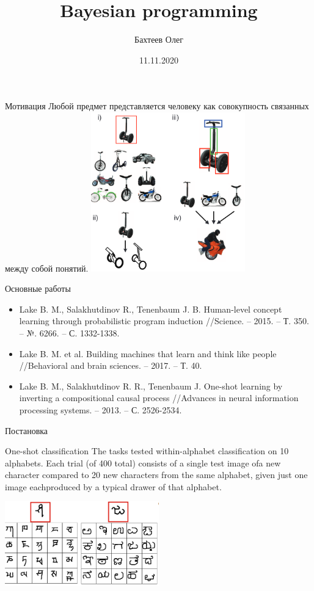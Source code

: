 \documentclass[usenames,dvipsnames,10pt,pdf,utf8,russian,aspectratio=43]{beamer}
\title[BP]{Bayesian programming}
\author{Бахтеев Олег}
\date{11.11.2020}
\begin{document}

\begin{frame}
  \titlepage
\end{frame}

\begin{frame}{Мотивация}
Любой предмет представляется человеку как совокупность связанных между собой понятий.
\centering
\includegraphics[width=0.5\textwidth]{moto.png}
\end{frame}

\begin{frame}{Основные работы}
\begin{itemize}
\item Lake B. M., Salakhutdinov R., Tenenbaum J. B. Human-level concept learning through probabilistic program induction //Science. – 2015. – Т. 350. – №. 6266. – С. 1332-1338.
\item Lake B. M. et al. Building machines that learn and think like people //Behavioral and brain sciences. – 2017. – Т. 40.
\item Lake B. M., Salakhutdinov R. R., Tenenbaum J. One-shot learning by inverting a compositional causal process //Advances in neural information processing systems. – 2013. – С. 2526-2534.
\end{itemize}
\end{frame}

\begin{frame}{Постановка}
\begin{block}{One-shot classification}
 The tasks tested within-alphabet classification on 10 alphabets.  Each trial (of 400 total) consists of a single test image ofa new character compared to 20 new characters from the same alphabet, given just one image eachproduced by a typical drawer of that alphabet.
\end{block}
\centering
\includegraphics[width=0.5\textwidth]{omni.png}
\end{frame}
\end{document}
